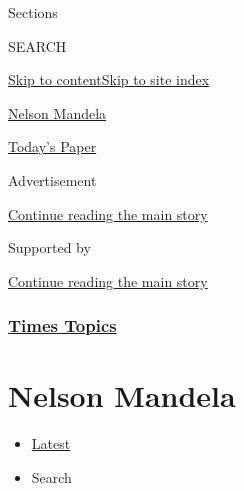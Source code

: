 Sections

SEARCH

\protect\hyperlink{site-content}{Skip to
content}\protect\hyperlink{site-index}{Skip to site index}

\href{https://www.nytimes3xbfgragh.onion/topic/person/nelson-mandela}{Nelson
Mandela}

\href{https://myaccount.nytimes3xbfgragh.onion/auth/login?response_type=cookie\&client_id=vi}{}

\href{https://www.nytimes3xbfgragh.onion/section/todayspaper}{Today's
Paper}

Advertisement

\protect\hyperlink{after-top}{Continue reading the main story}

Supported by

\protect\hyperlink{after-sponsor}{Continue reading the main story}

\hypertarget{times-topics}{%
\subsubsection{\texorpdfstring{\href{/index.html}{Times
Topics}}{Times Topics}}\label{times-topics}}

\hypertarget{nelson-mandela}{%
\section{Nelson Mandela}\label{nelson-mandela}}

\begin{itemize}
\tightlist
\item
  \protect\hyperlink{stream-panel}{Latest}
\item
  Search
\end{itemize}

